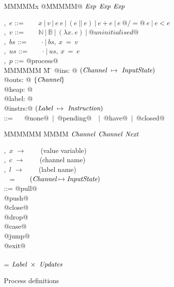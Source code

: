 
\begin{figure}
\begin{center}
\begin{minipage}[t]{0.4\textwidth}
\begin{tabbing}
MMMMMx \TABDEF @MMMMM@  \TABSKIP $\textit{Exp}$ \TABSKIP $\textit{Exp}$ \TABSKIP $\textit{Exp}$ \kill

\Exp,~$e$       \> ::= \> ~~~ $x~|~v~|~e~e ~|~ (e~||~e) ~|~ e+e ~|~ e~@/=@~e ~|~ e < e$ \\
\Value,~$v$     \> ::= \> ~~~ $\mathbb{N}~|~\mathbb{B}~|~(\lambda{}x.~e)~|~@uninitialised@$ \\
\Heap,~$bs$     \> ::= \> ~~~ $\cdot~|~bs,~x~=~v$ \\
\Updates,~$us$  \> ::= \> ~~~ $\cdot~|~us,~x~=~e$
\\[0.5em]

\Proc,~$p$      \> ::=\> @process@ \\
MMMMMM \= M \= \kill
\> \> @ins:   @  $(\textit{Channel} ~\mapsto~ \textit{InputState})$ \\
\> \> @outs:  @  $\{ \textit{Channel} \}$ \\
\> \> @heap:  @  \Heap \\
\> \> @label: @  \Label \\
\> \> @instrs:@  $(\textit{Label} ~\mapsto~ \textit{Instruction})$ 
\\[0.5em]
\InputState \> ::= \> ~~ @none@~$|$~@pending@~\Value~$|$~@have@~$|$~@closed@
\end{tabbing}

\begin{tabbing}
MMMMMM \TABDEF MMMM \TABSKIP $\textit{Channel}$ \TABSKIP $\textit{Channel}$ \TABSKIP $\textit{Next}$ \TABSKIP \kill

\Var,~$x$       \> $\to$ \> ~~~ (value variable) \\
\Chan,~$c$      \> $\to$ \> ~~~ (channel name) \\
\Label,~$l$     \> $\to$ \> ~~~ (label name) \\ 
\ChannelStates  \> ~ =   \> ~~~ $(\textit{Channel} \mapsto \textit{InputState})$ \\[0.5em]

\Instr
    \> ::=\> @pull@  \> \Chan  \> \Var  \> \Next \> \Next \\
    \TABALT  @push@  \> \Chan  \> \Exp  \> \Next \\
    \TABALT  @close@ \> \Chan  \>       \> \Next \\
    \TABALT  @drop@  \> \Chan  \>       \> \Next \\
    \TABALT  @case@  \> \Exp   \> \Next \> \Next \\
    \TABALT  @jump@  \>        \>       \> \Next \\
    \TABALT  @exit@  \\
\\[0.5em]

\Next \> = \> $\textit{Label}~\times~\textit{Updates}$ 
\end{tabbing}
\end{minipage}
\end{center}
\caption{Process definitions}
\label{fig:Process:Def}
\end{figure}

